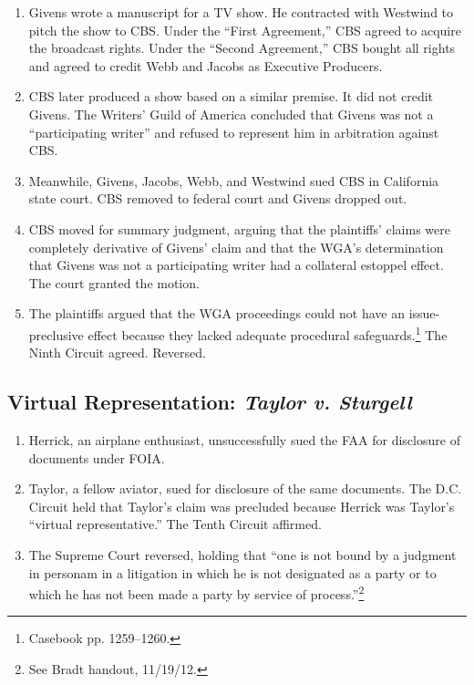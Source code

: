 \begin{enumerate}
    \item Givens wrote a manuscript for a TV show. He contracted with 
    Westwind to pitch the show to CBS. Under the ``First Agreement,'' CBS 
    agreed to acquire the broadcast rights. Under the ``Second Agreement,'' 
    CBS bought all rights and agreed to credit Webb and Jacobs as Executive 
    Producers.
    \item CBS later produced a show based on a similar premise. It did not 
    credit Givens. The Writers' Guild of America concluded that Givens was not 
    a ``participating writer'' and refused to represent him in arbitration 
    against CBS.
    \item Meanwhile, Givens, Jacobs, Webb, and Westwind sued CBS in California state 
    court. CBS removed to federal court and Givens dropped out.
    \item CBS moved for summary judgment, arguing that the plaintiffs' claims 
    were completely derivative of Givens' claim and that the WGA's 
    determination that Givens was not a participating writer had a collateral 
    estoppel effect. The court granted the motion.
    \item The plaintiffs argued that the WGA proceedings could not have an 
    issue-preclusive effect because they lacked adequate procedural 
    safeguards.\footnote{Casebook pp. 1259--1260.} The Ninth Circuit agreed. 
    Reversed.
\end{enumerate}

\subsection{Virtual Representation: \emph{Taylor v. Sturgell}}

\begin{enumerate}
    \item Herrick, an airplane enthusiast, unsuccessfully sued the FAA for disclosure of 
    documents under FOIA.
    \item Taylor, a fellow aviator, sued for disclosure of the same 
    documents. The D.C. Circuit held that Taylor's claim was precluded because 
    Herrick was Taylor's ``virtual representative.'' The Tenth Circuit 
    affirmed.
    \item The Supreme Court reversed, holding that ``one is not bound by a 
    judgment in personam in a litigation in which he is not designated as a 
    party or to which he has not been made a party by service of 
    process.''\footnote{See Bradt handout, 11/19/12.}
\end{enumerate}


